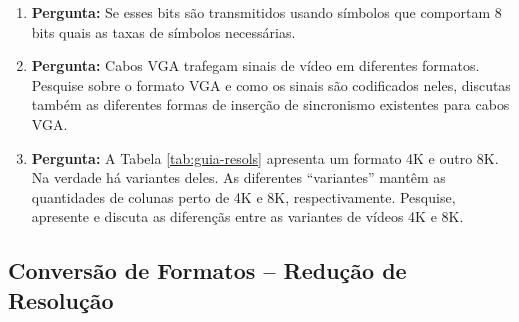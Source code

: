 \documentclass[11pt]{article}
\begin{document}
\begin{enumerate}
\item \textbf{Pergunta:} Se esses bits são transmitidos usando símbolos que comportam 8 bits quais as taxas de símbolos necessárias.



\item \textbf{Pergunta:} Cabos VGA trafegam sinais de vídeo em diferentes formatos. Pesquise sobre o formato VGA e como os sinais são codificados neles, discutas também as diferentes formas de inserção de sincronismo existentes para cabos VGA.

\item \textbf{Pergunta:}  A Tabela \ref{tab:guia-resols} apresenta um formato 4K e outro 8K. Na verdade há variantes deles. As diferentes ``variantes'' mantêm as quantidades de colunas perto de 4K e 8K, respectivamente. Pesquise, apresente e discuta as diferençãs entre as variantes de vídeos 4K e 8K.

\end{enumerate}

\subsection{Conversão de Formatos -- Redução de Resolução}
\end{document}
